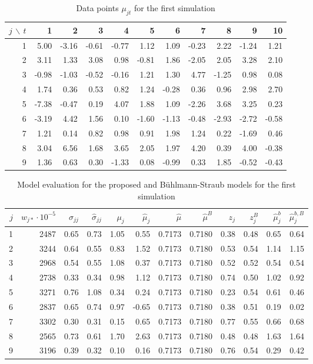 \documentclass[11pt]{article}
\theoremstyle{definition}
\begin{document}
\begin{table}[H]
\label{tab:1_sim_mu}
\centering
\caption{Data points $\mu_{jt}$ for the first simulation}
\begin{tabular}{rrrrrrrrrrr}
  \hline
 $j\,\backslash\, t$& 1 & 2 & 3 & 4 & 5 & 6 & 7 & 8 & 9 & 10 \\ 
  \hline
1 & 5.00 & -3.16 & -0.61 & -0.77 & 1.12 & 1.09 & -0.23 & 2.22 & -1.24 & 1.21 \\ 
  2 & 3.11 & 1.33 & 3.08 & 0.98 & -0.81 & 1.86 & -2.05 & 2.05 & 3.28 & 2.10 \\ 
  3 & -0.98 & -1.03 & -0.52 & -0.16 & 1.21 & 1.30 & 4.77 & -1.25 & 0.98 & 0.08 \\ 
  4 & 1.74 & 0.36 & 0.53 & 0.82 & 1.24 & -0.28 & 0.36 & 0.96 & 2.98 & 2.70 \\ 
  5 & -7.38 & -0.47 & 0.19 & 4.07 & 1.88 & 1.09 & -2.26 & 3.68 & 3.25 & 0.23 \\ 
  6 & -3.19 & 4.42 & 1.56 & 0.10 & -1.60 & -1.13 & -0.48 & -2.93 & -2.72 & -0.58 \\ 
  7 & 1.21 & 0.14 & 0.82 & 0.98 & 0.91 & 1.98 & 1.24 & 0.22 & -1.69 & 0.46 \\ 
  8 & 3.04 & 6.56 & 1.68 & 3.65 & 2.05 & 1.97 & 4.20 & 0.39 & 4.00 & -0.38 \\ 
  9 & 1.36 & 0.63 & 0.30 & -1.33 & 0.08 & -0.99 & 0.33 & 1.85 & -0.52 & -0.43 \\ 
   \hline
\end{tabular}
\end{table}

\begin{table}[H]
\label{tab:1_sim_eval}
\centering
\caption{Model evaluation for the proposed and Bühlmann-Straub models for the first simulation}
\begin{tabular}{rrrrrrrrrrrr}
  \hline
 $j$ & $w_{j\ast}\cdot 10^{-5}$ & $\sigma_{jj}$ & $\hat\sigma_{jj}$ & $\mu_j$ & $\hat\mu_j$ & $\hat\mu$ & $\hat\mu^B$ & $z_j$ & $z_j^B$ & $\hat\mu_j^b$ & $\hat\mu_j^{b,B}$ \\ 
  \hline
  1 & 2487 & 0.65 & 0.73 & 1.05 & 0.55 & 0.7173 & 0.7180 & 0.38 & 0.48 & 0.65 & 0.64 \\ 
  2 & 3244 & 0.64 & 0.55 & 0.83 & 1.52 & 0.7173 & 0.7180 & 0.53 & 0.54 & 1.14 & 1.15 \\ 
  3 & 2968 & 0.54 & 0.55 & 1.08 & 0.37 & 0.7173 & 0.7180 & 0.52 & 0.52 & 0.54 & 0.54 \\ 
  4 & 2738 & 0.33 & 0.34 & 0.98 & 1.12 & 0.7173 & 0.7180 & 0.74 & 0.50 & 1.02 & 0.92 \\ 
  5 & 3271 & 0.76 & 1.08 & 0.34 & 0.24 & 0.7173 & 0.7180 & 0.23 & 0.54 & 0.61 & 0.46 \\ 
  6 & 2837 & 0.65 & 0.74 & 0.97 & -0.65 & 0.7173 & 0.7180 & 0.38 & 0.51 & 0.19 & 0.02 \\ 
  7 & 3302 & 0.30 & 0.31 & 0.15 & 0.65 & 0.7173 & 0.7180 & 0.77 & 0.55 & 0.66 & 0.68 \\ 
  8 & 2565 & 0.73 & 0.61 & 1.70 & 2.63 & 0.7173 & 0.7180 & 0.48 & 0.48 & 1.63 & 1.64 \\ 
  9 & 3196 & 0.39 & 0.32 & 0.10 & 0.16 & 0.7173 & 0.7180 & 0.76 & 0.54 & 0.29 & 0.42 \\ 
   \hline
\end{tabular}
\end{table}
\end{document}
